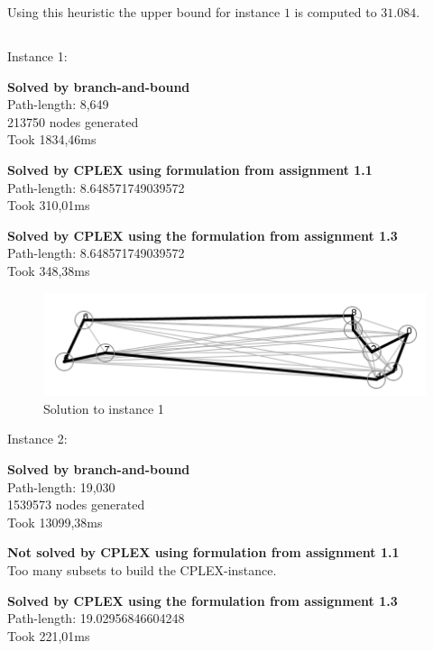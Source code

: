 Using this heuristic the upper bound for instance $1$ is computed to $31.084$.

\subsection{}
Instance 1:

\newpar \textbf{Solved by branch-and-bound}\\
Path-length: 8,649\\
213750 nodes generated\\
Took 1834,46ms

\newpar \textbf{Solved by CPLEX using formulation from assignment 1.1}\\
Path-length: 8.648571749039572\\
Took 310,01ms

\newpar \textbf{Solved by CPLEX using the formulation from assignment 1.3}\\
Path-length: 8.648571749039572\\
Took 348,38ms

\begin{figure}[H]
	\includegraphics[width=.9\textwidth]{figures/Instance1Solution.png}
	\caption{Solution to instance 1}
	\label{solution:1}
\end{figure}

\noindent Instance 2:

\newpar \textbf{Solved by branch-and-bound}\\
Path-length: 19,030\\
1539573 nodes generated\\
Took 13099,38ms

\newpar \textbf{Not solved by CPLEX using formulation from assignment 1.1}\\
Too many subsets to build the CPLEX-instance.

\newpar \textbf{Solved by CPLEX using the formulation from assignment 1.3}\\
Path-length: 19.02956846604248\\
Took 221,01ms


